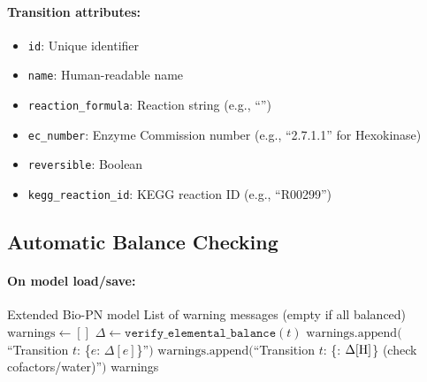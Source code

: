 \paragraph{Transition attributes:}
\begin{itemize}
    \item \texttt{id}: Unique identifier
    \item \texttt{name}: Human-readable name
    \item \texttt{reaction\_formula}: Reaction string (e.g., ``'')
    \item \texttt{ec\_number}: Enzyme Commission number (e.g., ``2.7.1.1'' for Hexokinase)
    \item \texttt{reversible}: Boolean
    \item \texttt{kegg\_reaction\_id}: KEGG reaction ID (e.g., ``R00299'')
\end{itemize}

\subsection{Automatic Balance Checking}
\label{subsec:auto-balance-checking}

\paragraph{On model load/save:}

\begin{algorithm}[htbp]
\caption{Validate model elemental balance}
\label{alg:validate-model}
\begin{algorithmic}[1]
\Require Extended Bio-PN model
\Ensure List of warning messages (empty if all balanced)
\State $\text{warnings} \gets []$
    \State $\Delta \gets \texttt{verify\_elemental\_balance}(t)$
    \If{$\Delta \neq \emptyset$}
             
                \State $\text{warnings}.\text{append}($``Transition $t$: \{$e$: $\Delta[e]$\}''$)$
             
                \State $\text{warnings}.\text{append}($``Transition $t$: \{: $\Delta[\ce{H}]$\} (check cofactors/water)''$)$
            \EndIf
        \EndFor
    \EndIf
\EndFor
\State \Return warnings
\end{algorithmic}
\end{algorithm}

